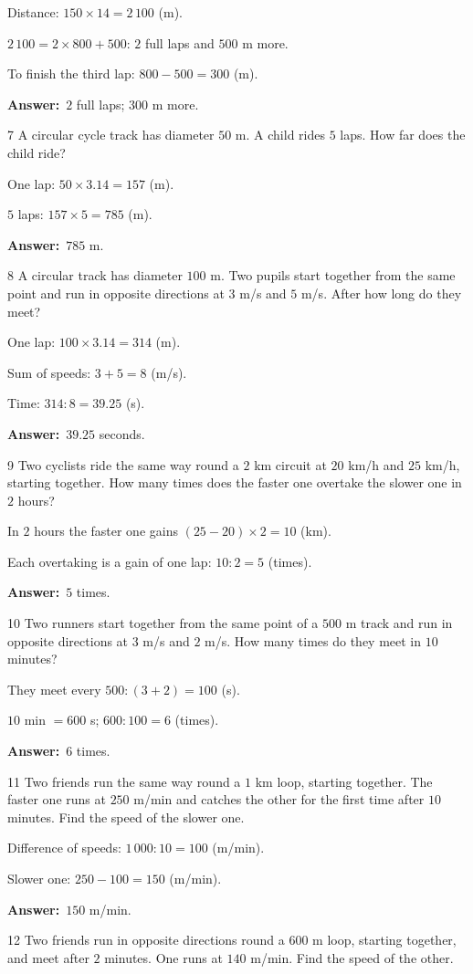 \documentclass[11pt]{article}
\newif\ifsol \solfalse
\providecommand{\AnsWord}{Đáp số}
\newcommand{\dapso}[1]{\par\textbf{\AnsWord:}\ #1}
\newcommand{\probsol}[1]{%
  \begin{lrbox}{\solmeasure}\begin{minipage}{\dimexpr\linewidth-24pt\relax}#1\end{minipage}\end{lrbox}%
  \ifsol
    \begin{solbox}#1\end{solbox}%
  \else
    \setlength{\solht}{\dimexpr\ht\solmeasure+\dp\solmeasure+0.85cm\relax}%
    \ifdim\solht<1.35cm\setlength{\solht}{1.35cm}\fi
    \begin{tcolorbox}[colback=white,colframe=Line,boxrule=0.8pt,arc=5pt,
      left=8pt,right=8pt,top=4pt,bottom=4pt,height=\solht]{\footnotesize\color{Slate}\itshape\WorkWord}\end{tcolorbox}%
  \fi}
\newcommand{\gap}{\vspace{0.3cm}}
\def\WorkWord{Your work:}
\def\AnsWord{Answer}
\begin{document}
\probsol{
Distance: $150\times14=2\,100$ (m).\par $2\,100=2\times800+500$: $2$ full laps and $500$ m more.\par
To finish the third lap: $800-500=300$ (m).
\dapso{$2$ full laps; $300$ m more.}}
\gap
\begin{probbox}{7}{\relax}
A circular cycle track has diameter $50$ m. A child rides $5$ laps. How far does the child ride?
\end{probbox}
\probsol{
One lap: $50\times3.14=157$ (m).\par $5$ laps: $157\times5=785$ (m).
\dapso{$785$ m.}}
\gap
\begin{probbox}{8}{\relax}
A circular track has diameter $100$ m. Two pupils start together from the same point and run in opposite directions at $3$ m/s and $5$ m/s. After how long do they meet?
\end{probbox}
\probsol{
One lap: $100\times3.14=314$ (m).\par Sum of speeds: $3+5=8$ (m/s).\par Time: $314:8=39.25$ (s).
\dapso{$39.25$ seconds.}}
\gap
\begin{probbox}{9}{\relax}
Two cyclists ride the same way round a $2$ km circuit at $20$ km/h and $25$ km/h, starting together. How many times does the faster one overtake the slower one in $2$ hours?
\end{probbox}
\probsol{
In $2$ hours the faster one gains $(25-20)\times2=10$ (km).\par Each overtaking is a gain of one lap: $10:2=5$ (times).
\dapso{$5$ times.}}
\gap
\begin{probbox}{10}{\relax}
Two runners start together from the same point of a $500$ m track and run in opposite directions at $3$ m/s and $2$ m/s. How many times do they meet in $10$ minutes?
\end{probbox}
\probsol{
They meet every $500:(3+2)=100$ (s).\par $10$ min $=600$ s; $600:100=6$ (times).
\dapso{$6$ times.}}
\gap
\begin{probbox}{11}{\relax}
Two friends run the same way round a $1$ km loop, starting together. The faster one runs at $250$ m/min and catches the other for the first time after $10$ minutes. Find the speed of the slower one.
\end{probbox}
\probsol{
Difference of speeds: $1\,000:10=100$ (m/min).\par Slower one: $250-100=150$ (m/min).
\dapso{$150$ m/min.}}
\gap
\begin{probbox}{12}{\relax}
Two friends run in opposite directions round a $600$ m loop, starting together, and meet after $2$ minutes. One runs at $140$ m/min. Find the speed of the other.
\end{probbox}
\end{document}
